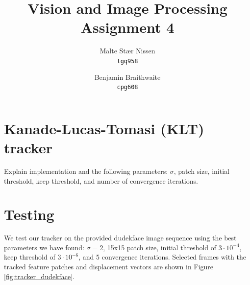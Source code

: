 \documentclass[11pt,a4paper]{article}
\title{Vision and Image Processing\\Assignment 4}
\author{Malte Stær Nissen    \\ \texttt{tgq958} \and
        Benjamin Braithwaite \\ \texttt{cpg608}}
\begin{document}
\maketitle

\section{Kanade-Lucas-Tomasi (KLT) tracker}

Explain implementation and the following parameters: $\sigma$, patch size, initial threshold, keep threshold, and number of convergence iterations.

\section{Testing}
%
We test our tracker on the provided dudekface image sequence using the best parameters we have found: $\sigma = 2$, 15x15 patch size, initial threshold of $3 \cdot 10^{-4}$, keep threshold of $3 \cdot 10^{-6}$, and 5 convergence iterations. Selected frames with the tracked feature patches and displacement vectors are shown in Figure \ref{fig:tracker_dudekface}.
%
\end{document}
